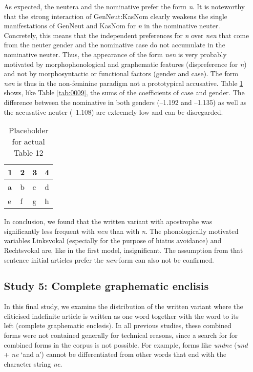 As expected, the neutera and the nominative prefer the form \textit{n}.
It is noteworthy that the strong interaction of GenNeut:KasNom clearly weakens the single manifestations of GenNeut and KasNom for \textit{n} in the nominative neuter.
Concretely, this means that the independent preferences for \textit{n} over \textit{nen} that come from the neuter gender and the nominative case do not accumulate in the nominative neuter.
Thus, the appearance of the form \textit{nen} is very probably motivated by morphophonological and graphematic features (dispreference for \textit{n}) and not by morphosyntactic or functional factors (gender and case).
The form \textit{nen} is thus in the non-feminine paradigm not a prototypical accusative.
Table \ref{tab:0012} shows, like Table \ref{tab:0009}, the sums of the coefficients of case and gender. %
The difference between the nominative in both genders (--1.192 and --1.135) as well as the accusative neuter (--1.108) are extremely low and can be disregarded.

\begin{table}
	\centering
	\begin{tabular}{llll}
		\toprule
		\textbf{1} & \textbf{2} & \textbf{3} & \textbf{4} \\
		\midrule
		a & b & c & d \\
		e & f & g & h \\
		\bottomrule
	\end{tabular}
	\caption{Placeholder for actual Table 12}
	\label{tab:0012}
\end{table}

In conclusion, we found that the written variant with apostrophe was significantly less frequent with \textit{nen} than with \textit{n}.
The phonologically motivated variables Linksvokal (especially for the purpose of hiatus avoidance) and Rechtsvokal are, like in the first model, insignificant.
The assumption from \citet{Vogel2006} that sentence initial articles prefer the \textit{nen}-form can also not be confirmed.

\subsection{Study 5: Complete graphematic enclisis}
\label{subsec:27s5GraphEnclisis}

In this final study, we examine the distribution of the written variant where the cliticised indefinite article is written as one word together with the word to its left (complete graphematic enclesis).
In all previous studies, these combined forms were not contained generally for technical reasons, since a search for for combined forms in the corpus is not possible.
For example, forms like \textit{undne} (\textit{und} + \textit{ne} `and a') cannot be differentiated from other words that end with the character string \textit{ne}.

